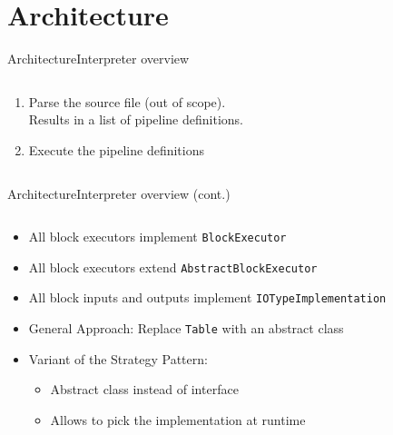 \section{Architecture}
\begin{frame}[t,fragile]{Architecture}{Interpreter overview}
	\begin{columns}[T]
		\begin{column}{0.5\linewidth}
			\begin{enumerate}
				\item Parse the source file (out of scope). \\
				      Results in a list of pipeline definitions.
				\item<2-> Execute the pipeline definitions
			\end{enumerate}
		\end{column}
		\hfill
		\begin{column}{0.5\linewidth}
			\centering
			
		\end{column}
	\end{columns}
\end{frame}
\begin{frame}[t]{Architecture}{Interpreter overview (cont.)}
	\begin{columns}[T]
		\begin{column}{0.4\linewidth}
			\begin{itemize}
				\item<1-> All block executors implement \Verb|BlockExecutor|
				\item<2-> All block executors extend \Verb|AbstractBlockExecutor|
				\item<3-> All block inputs and outputs implement \Verb|IOTypeImplementation|
				\item<4-> General Approach: Replace \Verb|Table| with an abstract class
				\item<6-> Variant of the Strategy Pattern\footnotemark:
				      \begin{itemize}[<6->]
					      \item Abstract class instead of interface
					      \item Allows to pick the implementation at runtime
				      \end{itemize}
			\end{itemize}
		\end{column}
		\hfill
		\begin{column}{0.5\linewidth}
			\begin{center}
				\footnotesize
				 {
					
				}
				\only<5-> {
					
				}
			\end{center}
		\end{column}
	\end{columns}
\end{frame}

